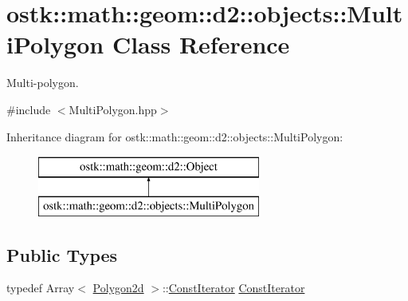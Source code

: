 \hypertarget{classostk_1_1math_1_1geom_1_1d2_1_1objects_1_1_multi_polygon}{}\section{ostk\+:\+:math\+:\+:geom\+:\+:d2\+:\+:objects\+:\+:Multi\+Polygon Class Reference}
\label{classostk_1_1math_1_1geom_1_1d2_1_1objects_1_1_multi_polygon}


Multi-\/polygon.  




{\ttfamily \#include $<$Multi\+Polygon.\+hpp$>$}

Inheritance diagram for ostk\+:\+:math\+:\+:geom\+:\+:d2\+:\+:objects\+:\+:Multi\+Polygon\+:\begin{figure}[H]
\begin{center}
\leavevmode
\includegraphics[height=2.000000cm]{classostk_1_1math_1_1geom_1_1d2_1_1objects_1_1_multi_polygon}
\end{center}
\end{figure}
\subsection*{Public Types}
\begin{DoxyCompactItemize}
\item 
typedef Array$<$ \hyperlink{namespaceostk_1_1math_1_1geom_1_1d2_1_1objects_a5786a3021d23f9c64937e263a2da9d27}{Polygon2d} $>$\+::\hyperlink{classostk_1_1math_1_1geom_1_1d2_1_1objects_1_1_multi_polygon_ade3439a576f75f37a3ebf8b4e195bad5}{Const\+Iterator} \hyperlink{classostk_1_1math_1_1geom_1_1d2_1_1objects_1_1_multi_polygon_ade3439a576f75f37a3ebf8b4e195bad5}{Const\+Iterator}
\end{DoxyCompactItemize}
